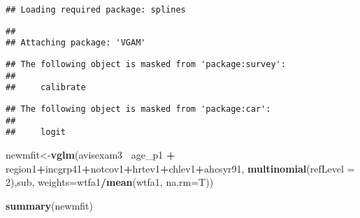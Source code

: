 \documentclass[]{article}
\newenvironment{Shaded}{\begin{snugshade}}{\end{snugshade}}
\newcommand{\DataTypeTok}[1]{\textcolor[rgb]{0.13,0.29,0.53}{#1}}
\newcommand{\DecValTok}[1]{\textcolor[rgb]{0.00,0.00,0.81}{#1}}
\newcommand{\KeywordTok}[1]{\textcolor[rgb]{0.13,0.29,0.53}{\textbf{#1}}}
\newcommand{\NormalTok}[1]{#1}
\newcommand{\OperatorTok}[1]{\textcolor[rgb]{0.81,0.36,0.00}{\textbf{#1}}}
\newcommand{\StringTok}[1]{\textcolor[rgb]{0.31,0.60,0.02}{#1}}
\begin{document}
\begin{verbatim}
## Loading required package: splines
\end{verbatim}

\begin{verbatim}
## 
## Attaching package: 'VGAM'
\end{verbatim}

\begin{verbatim}
## The following object is masked from 'package:survey':
## 
##     calibrate
\end{verbatim}

\begin{verbatim}
## The following object is masked from 'package:car':
## 
##     logit
\end{verbatim}

\begin{Shaded}
\begin{Highlighting}[]
\NormalTok{newmfit<-}\KeywordTok{vglm}\NormalTok{(avisexam3}\OperatorTok{~}\StringTok{ }\NormalTok{age_p1  }\OperatorTok{+}\StringTok{ }\NormalTok{region1}\OperatorTok{+}\NormalTok{incgrp41}\OperatorTok{+}\NormalTok{notcov1}\OperatorTok{+}\NormalTok{hrtev1}\OperatorTok{+}\NormalTok{chlev1}\OperatorTok{+}\NormalTok{ahcsyr91,}
           \KeywordTok{multinomial}\NormalTok{(}\DataTypeTok{refLevel =} \DecValTok{2}\NormalTok{),sub,}
           \DataTypeTok{weights=}\NormalTok{wtfa1}\OperatorTok{/}\KeywordTok{mean}\NormalTok{(wtfa1, }\DataTypeTok{na.rm=}\NormalTok{T))}

\KeywordTok{summary}\NormalTok{(newmfit)}
\end{Highlighting}
\end{Shaded}
\end{document}
